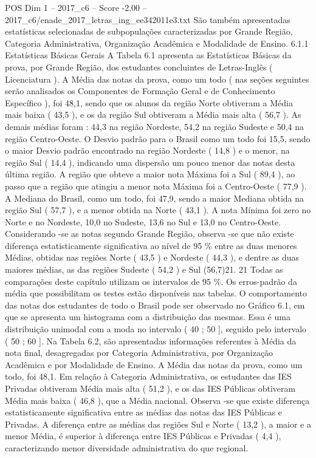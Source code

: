 \begin{textsample}{POS Dim 1 – 2017\_c6 – Score -2.00 – 2017\_c6/enade\_2017\_letras\_ing\_ee342011e3.txt}
São também apresentadas estatísticas selecionadas de subpopulações caracterizadas por Grande Região, Categoria Administrativa, Organização Acadêmica e Modalidade de Ensino. 6.1.1 Estatísticas Básicas Gerais A Tabela 6.1 apresenta as Estatísticas Básicas da prova, por Grande Região, dos estudantes concluintes de Letras-Inglês ( Licenciatura ).
A Média das notas da prova, como um todo ( nas seções seguintes serão analisados os Componentes de Formação Geral e de Conhecimento Específico ), foi 48,1, sendo que os alunos da região Norte obtiveram a Média mais baixa ( 43,5 ), e os da região Sul obtiveram a Média mais alta ( 56,7 ).
As demais médias foram : 44,3 na região Nordeste, 54,2 na região Sudeste e 50,4 na região Centro-Oeste.
O Desvio padrão para o Brasil como um todo foi 15,5, sendo o maior Desvio padrão encontrado na região Nordeste ( 14,8 ) e o menor, na região Sul ( 14,4 ), indicando uma dispersão um pouco menor das notas desta última região.
A região que obteve a maior nota Máxima foi a Sul ( 89,4 ), ao passo que a região que atingiu a menor nota Máxima foi a Centro-Oeste ( 77,9 ).
A Mediana do Brasil, como um todo, foi 47,9, sendo a maior Mediana obtida na região Sul ( 57,7 ), e a menor obtida na Norte ( 43,1 ).
A nota Mínima foi zero no Norte e no Nordeste, 10,0 no Sudeste, 13,6 no Sul e 13,0 no Centro-Oeste.
Considerando -se as notas segundo Grande Região, observa -se que não existe diferença estatisticamente significativa ao nível de 95 \% entre as duas menores Médias, obtidas nas regiões Norte ( 43,5 ) e Nordeste ( 44,3 ), e dentre as duas maiores médias, as das regiões Sudeste ( 54,2 ) e Sul (56,7)21. 21 Todas as comparações deste capítulo utilizam os intervalos de 95 \%.
Os erros-padrão da média que possibilitam os testes estão disponíveis nas tabelas.
O comportamento das notas dos estudantes de todo o Brasil pode ser observado no Gráfico 6.1, em que se apresenta um histograma com a distribuição das mesmas.
Essa é uma distribuição unimodal com a moda no intervalo ( 40 ; 50 ], seguido pelo intervalo ( 50 ; 60 ].
Na Tabela 6.2, são apresentadas informações referentes à Média da nota final, desagregadas por Categoria Administrativa, por Organização Acadêmica e por Modalidade de Ensino.
A Média das notas da prova, como um todo, foi 48,1.
Em relação à Categoria Administrativa, os estudantes das IES Privadas obtiveram Média mais alta ( 51,2 ), e os das IES Públicas obtiveram Média mais baixa ( 46,8 ), que a Média nacional.
Observa -se que existe diferença estatisticamente significativa entre as médias das notas das IES Públicas e Privadas.
A diferença entre as médias das regiões Sul e Norte ( 13,2 ), a maior e a menor Média, é superior à diferença entre IES Públicas e Privadas ( 4,4 ), caracterizando menor diversidade administrativa do que regional.

\end{textsample}
